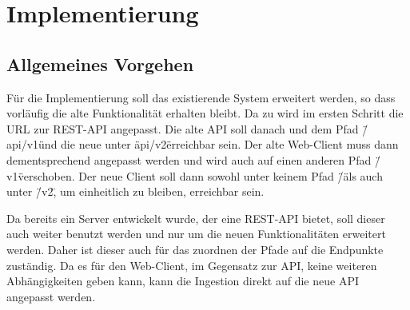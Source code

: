 \section{Implementierung}

\subsection{Allgemeines Vorgehen}
Für die Implementierung soll das existierende System erweitert werden, so dass vorläufig die alte Funktionalität erhalten bleibt.
Da zu wird im ersten Schritt die URL zur REST-API angepasst. 
Die alte API soll danach und dem Pfad \"/api/v1\" und die neue unter \"api/v2\" erreichbar sein.
Der alte Web-Client muss dann dementsprechend angepasst werden und wird auch auf einen anderen Pfad \"/v1\" verschoben.
Der neue Client soll dann sowohl unter keinem Pfad \"/\" als auch unter \"/v2\", um einheitlich zu bleiben, erreichbar sein.

Da bereits ein Server entwickelt wurde, der eine REST-API bietet, soll dieser auch weiter benutzt werden und nur um die neuen Funktionalitäten erweitert werden.
Daher ist dieser auch für das zuordnen der Pfade auf die Endpunkte zuständig.
Da es für den Web-Client, im Gegensatz zur API, keine weiteren Abhängigkeiten geben kann, kann die Ingestion direkt auf die neue API angepasst werden.